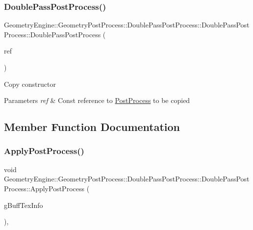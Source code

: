 \subsubsection{\texorpdfstring{DoublePassPostProcess()}{DoublePassPostProcess()}\hspace{0.1cm}{\footnotesize\ttfamily [2/2]}}
{\footnotesize\ttfamily Geometry\+Engine\+::\+Geometry\+Post\+Process\+::\+Double\+Pass\+Post\+Process\+::\+Double\+Pass\+Post\+Process\+::\+Double\+Pass\+Post\+Process (\begin{DoxyParamCaption}\item[{const \mbox{\hyperlink{class_geometry_engine_1_1_geometry_post_process_1_1_double_pass_post_process_1_1_double_pass_post_process}{Double\+Pass\+Post\+Process}} \&}]{ref }\end{DoxyParamCaption})\hspace{0.3cm}{\ttfamily [inline]}}

Copy constructor 
\begin{DoxyParams}{Parameters}
{\em ref} & Const reference to \mbox{\hyperlink{class_geometry_engine_1_1_geometry_post_process_1_1_post_process}{Post\+Process}} to be copied \\
\hline
\end{DoxyParams}


\subsection{Member Function Documentation}
\mbox{\label{class_geometry_engine_1_1_geometry_post_process_1_1_double_pass_post_process_1_1_double_pass_post_process_a9d2674bc5b237ed2e494d1c88f63d29e}} 
\subsubsection{\texorpdfstring{ApplyPostProcess()}{ApplyPostProcess()}}
{\footnotesize\ttfamily void Geometry\+Engine\+::\+Geometry\+Post\+Process\+::\+Double\+Pass\+Post\+Process\+::\+Double\+Pass\+Post\+Process\+::\+Apply\+Post\+Process (\begin{DoxyParamCaption}\item[{const \mbox{\hyperlink{class_geometry_engine_1_1_g_buffer_texture_info}{G\+Buffer\+Texture\+Info}} \&}]{g\+Buff\+Tex\+Info }\end{DoxyParamCaption})\hspace{0.3cm}{\ttfamily [override]}, {\ttfamily [virtual]}}

